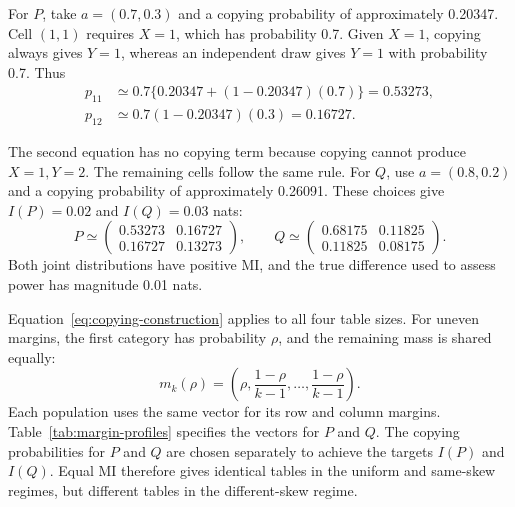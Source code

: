 \begin{samepage}
\medskip
{}

For \(P\), take \(a=(0.7,0.3)\) and a copying probability of
approximately 0.20347. Cell \((1,1)\) requires \(X=1\), which has
probability 0.7. Given \(X=1\), copying always gives \(Y=1\), whereas
an independent draw gives \(Y=1\) with probability 0.7. Thus
\begin{align*}
 p_{11}&\simeq0.7\{0.20347+(1-0.20347)(0.7)\}=0.53273,\\
 p_{12}&\simeq0.7(1-0.20347)(0.3)=0.16727.
\end{align*}
\end{samepage}
The second equation has no copying term because copying cannot produce
\(X=1,Y=2\). The remaining cells follow the same rule.
For \(Q\), use \(a=(0.8,0.2)\) and a copying probability of approximately
0.26091. These choices give \(I(P)=0.02\) and \(I(Q)=0.03\) nats:
\begin{equation}
 P\simeq\begin{pmatrix}0.53273&0.16727\\0.16727&0.13273\end{pmatrix},
 \qquad
 Q\simeq\begin{pmatrix}0.68175&0.11825\\0.11825&0.08175\end{pmatrix}.
 \label{eq:design-example-pair}
\end{equation}
Both joint distributions have positive MI, and the true difference used
to assess power has magnitude 0.01 nats.

\medskip
{}

Equation~\eqref{eq:copying-construction} applies to all four table sizes.
For uneven margins, the first category has probability \(\rho\), and the
remaining mass is shared equally:
\begin{equation}
 m_k(\rho)=\left(\rho,\frac{1-\rho}{k-1},\ldots,
                   \frac{1-\rho}{k-1}\right).
 \label{eq:skew-margin}
\end{equation}
Each population uses the same vector for its row and column margins.
Table~\ref{tab:margin-profiles} specifies the vectors for \(P\) and \(Q\).
The copying probabilities for \(P\) and \(Q\) are chosen separately to
achieve the targets \(I(P)\) and \(I(Q)\). Equal MI therefore gives identical
tables in the uniform and
same-skew regimes, but different tables in the different-skew regime.

